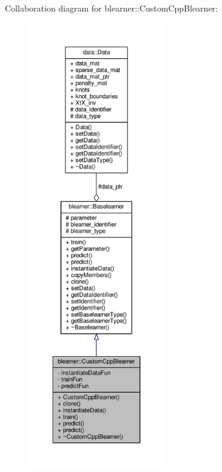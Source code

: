 Collaboration diagram for blearner\+:\+:Custom\+Cpp\+Blearner\+:\nopagebreak
\begin{figure}[H]
\begin{center}
\leavevmode
\includegraphics[height=550pt]{classblearner_1_1_custom_cpp_blearner__coll__graph}
\end{center}
\end{figure}
